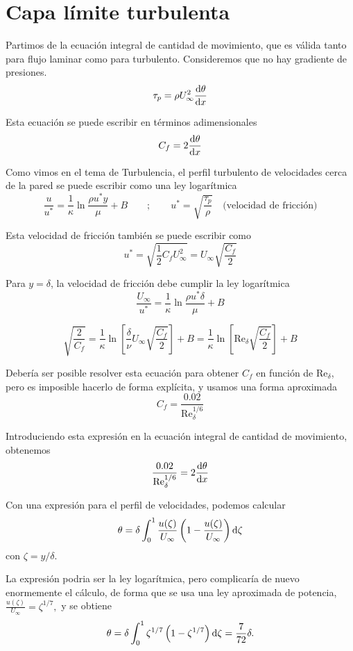 \section{Capa límite turbulenta}

	
	Partimos de la ecuación integral de cantidad de movimiento, que es
	válida tanto para flujo laminar como para turbulento. Consideremos
	que no hay gradiente de presiones. 
	\[
	\tau_{p}=\rho U_{\infty}^{2}\frac{\textrm{d} \theta}{\textrm{d} x}
	\]
	
	Esta ecuación se puede escribir en términos adimensionales 
	\[
	C_{f}=2\frac{\textrm{d} \theta}{\textrm{d} x}
	\]
	
	Como vimos en el tema de Turbulencia, el perfil turbulento de velocidades
	cerca de la pared se puede escribir como una ley logarítmica 
	\[
	\frac{u}{u^{*}}=\frac{1}{\kappa}\ln\frac{\rho u^{*}y}{\mu}+B\qquad;\qquad u^{*}=\sqrt{\frac{\tau_{p}}{\rho}}\quad\text{(velocidad de fricción)}
	\]
	

	
	Esta velocidad de fricción también se puede escribir como 
	\[
	u^{*}=\sqrt{\frac{1}{2}C_{f}U_{\infty}^{2}}=U_{\infty}\sqrt{\frac{C_{f}}{2}}
	\]
	
	Para $y=\delta$, la velocidad de fricción debe cumplir la ley logarítmica
	\[
	\frac{U_{\infty}}{u^{*}}=\frac{1}{\kappa}\ln\frac{\rho u^{*}\delta}{\mu}+B
	\]
	
	\[
	\sqrt{\frac{2}{C_{f}}}=\frac{1}{\kappa}\ln\left[\frac{\delta}{\nu}U_{\infty}\sqrt{\frac{C_{f}}{2}}\right]+B=\frac{1}{\kappa}\ln\left[\text{Re}_{\delta}\sqrt{\frac{C_{f}}{2}}\right]+B
	\]
	
	Debería ser posible resolver esta ecuación para obtener $C_{f}$ en
	función de $\text{Re}_{\delta}$, pero es imposible hacerlo de forma
	explícita, y usamos una forma aproximada 
	\[
	C_{f}=\frac{0.02}{\text{Re}_{\delta}^{1/6}}
	\]
	

	
	Introduciendo esta expresión en la ecuación integral de cantidad de
	movimiento, obtenemos 
	\[
	\frac{0.02}{\text{Re}_{\delta}^{1/6}}=2\frac{\textrm{d} \theta}{\textrm{d} x}
	\]
	
	Con una expresión para el perfil de velocidades, podemos calcular
	\[
	\theta=\delta\int_{0}^{1}\frac{u(\zeta)}{U_{\infty}}\left(1-\frac{u(\zeta)}{U_{\infty}}\right)\text{d}\zeta
	\]
	con $\zeta=y/\delta$. 
	
	La expresión podria ser la ley logarítmica, pero complicaría de nuevo
	enormemente el cálculo, de forma que se usa una ley aproximada de
	potencia, $\frac{u(\zeta)}{U_{\infty}}=\zeta^{1/7},$ y se obtiene
	\[
	\theta=\delta\int_{0}^{1}\zeta^{1/7}\left(1-\zeta^{1/7}\right)\text{d}\zeta=\frac{7}{72}\delta.
	\]
	

